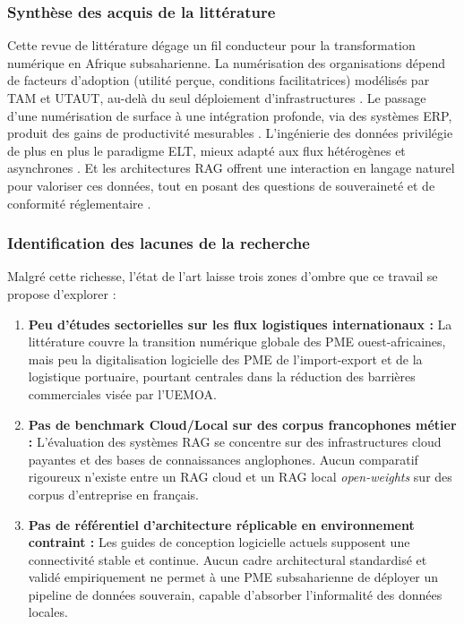\subsubsection{Synthèse des acquis de la littérature}

Cette revue de littérature dégage un fil conducteur pour la transformation numérique en Afrique subsaharienne. La numérisation des organisations dépend de facteurs d'adoption (utilité perçue, conditions facilitatrices) modélisés par TAM et UTAUT, au-delà du seul déploiement d'infrastructures \cite{davisTechnologyAcceptanceModel1989, venkateshUserAcceptanceInformation2003}. Le passage d'une numérisation de surface à une intégration profonde, via des systèmes ERP, produit des gains de productivité mesurables \cite{IMPACTLADOPTIONTECHNOLOGIES2025, tadjuidjeTechnologiesLeadershipRevolutionner2024}. L'ingénierie des données privilégie de plus en plus le paradigme ELT, mieux adapté aux flux hétérogènes et asynchrones \cite{akindemowoConceptualFrameworkAutomating2021, reisFundamentalsDataEngineering2022}. Et les architectures RAG offrent une interaction en langage naturel pour valoriser ces données, tout en posant des questions de souveraineté et de conformité réglementaire \cite{lewisRetrievalaugmentedGenerationKnowledgeintensive2020, anssibsiCloudSovereignty2025, nothiasIntellectualHistoryDigital2025}.

\subsubsection{Identification des lacunes de la recherche}

Malgré cette richesse, l'état de l'art laisse trois zones d'ombre que ce travail se propose d'explorer :
\begin{enumerate}
    \item \textbf{Peu d'études sectorielles sur les flux logistiques internationaux :} La littérature couvre la transition numérique globale des PME ouest-africaines, mais peu la digitalisation logicielle des PME de l'import-export et de la logistique portuaire, pourtant centrales dans la réduction des barrières commerciales visée par l'UEMOA.
    \item \textbf{Pas de benchmark Cloud/Local sur des corpus francophones métier :} L'évaluation des systèmes RAG se concentre sur des infrastructures cloud payantes et des bases de connaissances anglophones. Aucun comparatif rigoureux n'existe entre un RAG cloud et un RAG local \textit{open-weights} sur des corpus d'entreprise en français.
    \item \textbf{Pas de référentiel d'architecture réplicable en environnement contraint :} Les guides de conception logicielle actuels supposent une connectivité stable et continue. Aucun cadre architectural standardisé et validé empiriquement ne permet à une PME subsaharienne de déployer un pipeline de données souverain, capable d'absorber l'informalité des données locales.
\end{enumerate}

